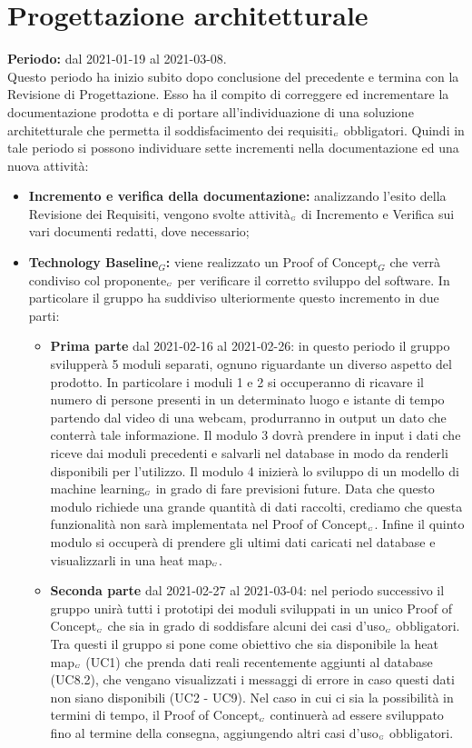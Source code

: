 \section{Progettazione architetturale}\label{PianificazioneProgettazioneArchitetturale}
\textbf{Periodo:} dal 2021-01-19 al 2021-03-08. \\
Questo periodo ha inizio subito dopo conclusione del precedente e termina con la Revisione di Progettazione.
Esso ha il compito di correggere ed incrementare la documentazione prodotta e di portare all'individuazione di una soluzione architetturale che permetta il soddisfacimento dei requisiti$_{\scaleto{G}{3pt}}$ obbligatori. Quindi in tale periodo si possono individuare sette incrementi nella documentazione ed una nuova attività:
\begin{itemize}
	\item \textbf{Incremento e verifica della documentazione:} analizzando l'esito della Revisione dei Requisiti, vengono svolte attività$_{\scaleto{G}{3pt}}$ di Incremento e Verifica sui vari documenti redatti, dove necessario;
	\item \textbf{Technology Baseline$_G$:}	viene realizzato un Proof of Concept$_G$ che verrà condiviso col proponente$_{\scaleto{G}{3pt}}$ per verificare il corretto sviluppo del software. In particolare il gruppo ha suddiviso ulteriormente questo incremento in due parti:
	\begin{itemize}
		\item \textbf{Prima parte} dal 2021-02-16 al 2021-02-26: in questo periodo il gruppo svilupperà 5 moduli separati, ognuno riguardante un diverso aspetto del prodotto. In particolare i moduli 1 e 2 si occuperanno di ricavare il numero di persone presenti in un determinato luogo e istante di tempo partendo dal video di una webcam, produrranno in output un dato che conterrà tale informazione. Il modulo 3 dovrà prendere in input i dati che riceve dai moduli precedenti e salvarli nel database in modo da renderli disponibili per l'utilizzo. Il modulo 4 inizierà lo sviluppo di un modello di machine learning$_{\scaleto{G}{3pt}}$ in grado di fare previsioni future. Data che questo modulo richiede una grande quantità di dati raccolti, crediamo che questa funzionalità non sarà implementata nel Proof of Concept$_{\scaleto{G}{3pt}}$. Infine il quinto modulo si occuperà di prendere gli ultimi dati caricati nel database e visualizzarli in una heat map$_{\scaleto{G}{3pt}}$.
		\item \textbf{Seconda parte} dal 2021-02-27 al 2021-03-04: nel periodo successivo il gruppo unirà tutti i prototipi dei moduli sviluppati in un unico Proof of Concept$_{\scaleto{G}{3pt}}$ che sia in grado di soddisfare alcuni dei casi d'uso$_{\scaleto{G}{3pt}}$ obbligatori. Tra questi il gruppo si pone come obiettivo che sia disponibile la heat map$_{\scaleto{G}{3pt}}$ (UC1) che prenda dati reali recentemente aggiunti al database (UC8.2), che vengano visualizzati i messaggi di errore in caso questi dati non siano disponibili (UC2 - UC9). Nel caso in cui ci sia la possibilità in termini di tempo, il Proof of Concept$_{\scaleto{G}{3pt}}$ continuerà ad essere sviluppato fino al termine della consegna, aggiungendo altri casi d'uso$_{\scaleto{G}{3pt}}$ obbligatori.

\end{itemize}
\end{itemize}

